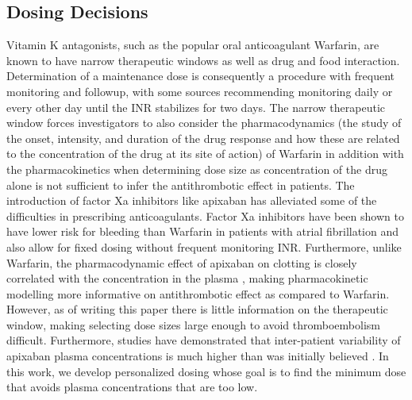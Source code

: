 \subsection*{Dosing Decisions}

Vitamin K antagonists, such as the popular oral anticoagulant Warfarin, are known to have narrow therapeutic windows as well as drug and food interaction. Determination of a maintenance dose is consequently a procedure with frequent monitoring and followup, with some sources recommending monitoring daily or every other day until the INR stabilizes for two days.  The narrow therapeutic window forces investigators to also consider the pharmacodynamics (the study of the onset, intensity, and duration of the drug response and how these are related to the concentration of the drug at its site of action) of Warfarin in addition with the pharmacokinetics when determining dose size as concentration of the drug alone is not sufficient to infer the antithrombotic effect in patients. The introduction of factor Xa inhibitors like apixaban has alleviated some of the difficulties in prescribing anticoagulants.  Factor Xa inhibitors have been shown to have lower risk for bleeding than Warfarin in patients with atrial fibrillation \cite{vinogradova2018risks} and also allow for fixed dosing without frequent monitoring INR. Furthermore, unlike Warfarin, the pharmacodynamic effect of apixaban on clotting is closely correlated with the concentration in the plasma \cite{Byon2019-gf}, making pharmacokinetic modelling more informative on antithrombotic effect as compared to Warfarin.  However, as of writing this paper there is little information on the therapeutic window, making selecting dose sizes large enough to avoid thromboembolism difficult. Furthermore, studies have demonstrated that inter-patient variability of apixaban plasma concentrations is much higher than was initially believed \cite{gulilat2020drug}. In this work, we develop personalized dosing whose goal is to find the minimum dose that avoids plasma concentrations that are too low. 

